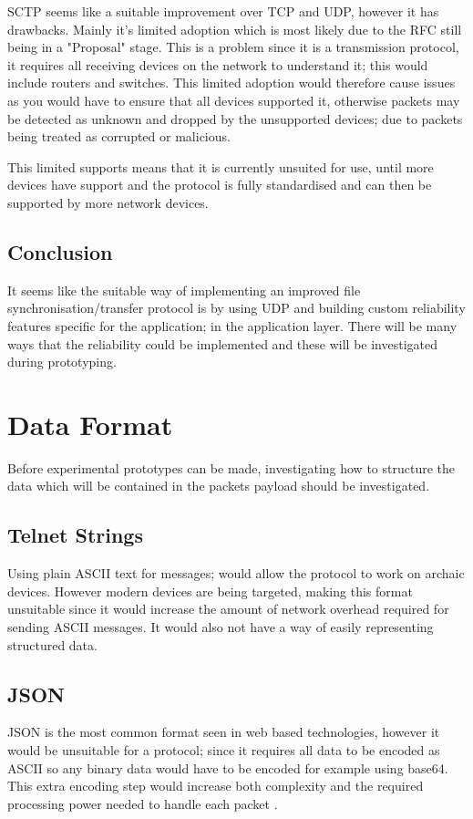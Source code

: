 SCTP seems like a suitable improvement over TCP and UDP, however it has drawbacks. Mainly it's limited adoption which is most likely due to the RFC still being in a "Proposal" stage. This is a problem since it is a transmission protocol, it requires all receiving devices on the network to understand it; this would include routers and switches. This limited adoption would therefore cause issues as you would have to ensure that all devices supported it, otherwise packets may be detected as unknown and dropped by the unsupported devices; due to packets being treated as corrupted or malicious.

This limited supports means that it is currently unsuited for use, until more devices have support and the protocol is fully standardised and can then be supported by more network devices.

\subsection*{Conclusion}
It seems like the suitable way of implementing an improved file synchronisation/transfer protocol is by using UDP and building custom reliability features specific for the application; in the application layer. There will be many ways that the reliability could be implemented and these will be investigated during prototyping.


\section{Data Format}
Before experimental prototypes can be made, investigating how to structure the data which will be contained in the packets payload should be investigated.

\subsection*{Telnet Strings}
Using plain ASCII text for messages; would allow the protocol to work on archaic devices. However modern devices are being targeted, making this format unsuitable since it would increase the amount of network overhead required for sending ASCII messages. It would also not have a way of easily representing structured data.

\subsection*{JSON}
JSON is the most common format seen in web based technologies, however it would be unsuitable for a protocol; since it requires all data to be encoded as ASCII so any binary data would have to be encoded for example using base64. This extra encoding step would increase both complexity and the required processing power needed to handle each packet \parencite{json-rfc8259}.

